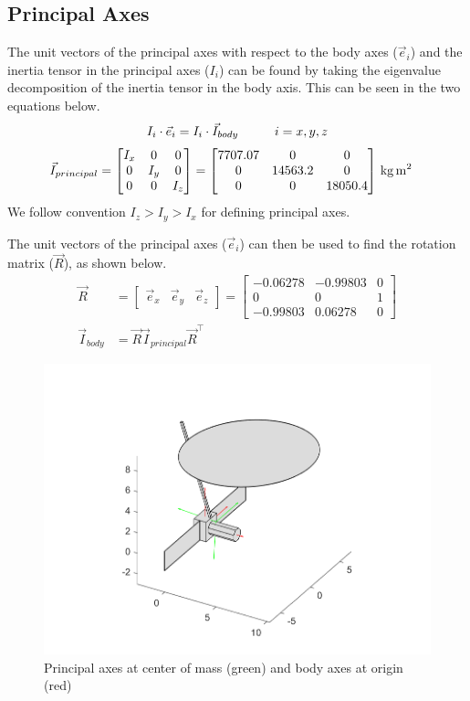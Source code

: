 \subsection{Principal Axes}
The unit vectors of the principal axes with respect to the body axes ($\Vec{e}_i$) and the inertia tensor in the principal axes ($I_i$) can be found by taking the eigenvalue decomposition of the inertia tensor in the body axis. This can be seen in the two equations below.
\begin{equation*}
    I_i \cdot \Vec{e}_i = I_i \cdot \Vec{I}_{body} \\ \hspace{1cm} i = x, y, z
\end{equation*}
\begin{align*}
\Vec{I}_{principal} &= 
    \begin{bmatrix}
    I_x & 0 & 0 \\
    0 & I_y & 0 \\
    0 & 0 & I_z 
    \end{bmatrix}
= 
\qty[parse-numbers = false]{
    \begin{bmatrix}
    7707.07 & 0 & 0 \\
    0 & 14563.2 & 0 \\
    0 & 0 & 18050.4 
    \end{bmatrix}
}{\kilogram\metre\squared}
\end{align*}
We follow convention $I_z > I_y > I_x$ for defining principal axes.

The unit vectors of the principal axes ($\Vec{e}_i$) can then be used to find the rotation matrix ($\Vec{R}$), as shown below.
\begin{align*}
\Vec{R} &= 
    \begin{bmatrix}
    \Vec{e}_x & \Vec{e}_y & \Vec{e}_z 
    \end{bmatrix}
= 
    \begin{bmatrix}
    -0.06278 & -0.99803 & 0 \\
    0 & 0 & 1 \\
    -0.99803 & 0.06278 & 0 
    \end{bmatrix} \\
    \Vec{I}_{body} &= \Vec{R} \Vec{I}_{principal} \Vec{R}^{\intercal}
\end{align*}

\begin{figure}[H]
\centering
\includegraphics[scale=0.7]{Images/ps2_model.png}
\caption{Principal axes at center of mass (green) and body axes at origin (red)}
\label{fig:ps2_model}
\end{figure}